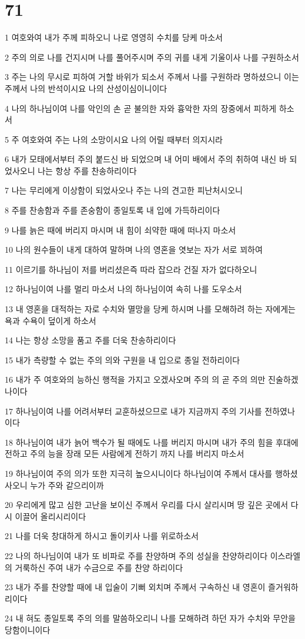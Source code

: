 \chapter{71}

\par 1 여호와여 내가 주께 피하오니 나로 영영히 수치를 당케 마소서
\par 2 주의 의로 나를 건지시며 나를 풀어주시며 주의 귀를 내게 기울이사 나를 구원하소서
\par 3 주는 나의 무시로 피하여 거할 바위가 되소서 주께서 나를 구원하라 명하셨으니 이는 주께서 나의 반석이시요 나의 산성이심이니이다
\par 4 나의 하나님이여 나를 악인의 손 곧 불의한 자와 흉악한 자의 장중에서 피하게 하소서
\par 5 주 여호와여 주는 나의 소망이시요 나의 어릴 때부터 의지시라
\par 6 내가 모태에서부터 주의 붙드신 바 되었으며 내 어미 배에서 주의 취하여 내신 바 되었사오니 나는 항상 주를 찬송하리이다
\par 7 나는 무리에게 이상함이 되었사오나 주는 나의 견고한 피난처시오니
\par 8 주를 찬송함과 주를 존숭함이 종일토록 내 입에 가득하리이다
\par 9 나를 늙은 때에 버리지 마시며 내 힘이 쇠약한 때에 떠나지 마소서
\par 10 나의 원수들이 내게 대하여 말하며 나의 영혼을 엿보는 자가 서로 꾀하여
\par 11 이르기를 하나님이 저를 버리셨은즉 따라 잡으라 건질 자가 없다하오니
\par 12 하나님이여 나를 멀리 마소서 나의 하나님이여 속히 나를 도우소서
\par 13 내 영혼을 대적하는 자로 수치와 멸망을 당케 하시며 나를 모해하려 하는 자에게는 욕과 수욕이 덮이게 하소서
\par 14 나는 항상 소망을 품고 주를 더욱 찬송하리이다
\par 15 내가 측량할 수 없는 주의 의와 구원을 내 입으로 종일 전하리이다
\par 16 내가 주 여호와의 능하신 행적을 가지고 오겠사오며 주의 의 곧 주의 의만 진술하겠나이다
\par 17 하나님이여 나를 어려서부터 교훈하셨으므로 내가 지금까지 주의 기사를 전하였나이다
\par 18 하나님이여 내가 늙어 백수가 될 때에도 나를 버리지 마시며 내가 주의 힘을 후대에 전하고 주의 능을 장래 모든 사람에게 전하기 까지 나를 버리지 마소서
\par 19 하나님이여 주의 의가 또한 지극히 높으시니이다 하나님이여 주께서 대사를 행하셨사오니 누가 주와 같으리이까
\par 20 우리에게 많고 심한 고난을 보이신 주께서 우리를 다시 살리시며 땅 깊은 곳에서 다시 이끌어 올리시리이다
\par 21 나를 더욱 창대하게 하시고 돌이키사 나를 위로하소서
\par 22 나의 하나님이여 내가 또 비파로 주를 찬양하며 주의 성실을 찬양하리이다 이스라엘의 거룩하신 주여 내가 수금으로 주를 찬양 하리이다
\par 23 내가 주를 찬양할 때에 내 입술이 기뻐 외치며 주께서 구속하신 내 영혼이 즐거워하리이다
\par 24 내 혀도 종일토록 주의 의를 말씀하오리니 나를 모해하려 하던 자가 수치와 무안을 당함이니이다

